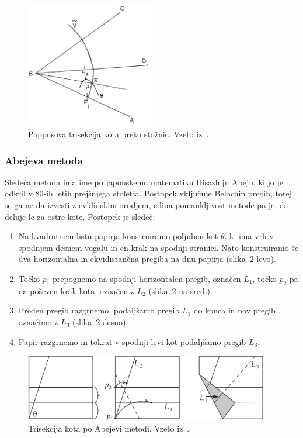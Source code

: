 \begin{figure}[h]
    \centering
    \includegraphics[width=0.5\textwidth]{images/starogr_problemi/trisection_grska.png}
    \caption[Pappusova trisekcija kota]{Pappusova trisekcija kota preko stožnic. Vzeto iz~\cite[str.\ 7]{videla1997}.}
    \label{fig:trisection_gr}
\end{figure}

\subsubsection*{Abejeva metoda}

Sledeča metoda ima ime po japonskemu matematiku Hisashiju Abeju, ki jo je odkril v $80$-ih letih prejšnjega stoletja. Postopek vključuje Belochin pregib, torej se ga ne da izvesti z evklidskim orodjem, edina pomankljivost metode pa je, da deluje le za ostre kote. Postopek je sledeč:

\begin{enumerate}
    \item Na kvadratnem listu papirja konstruiramo poljuben kot $\theta$, ki ima vrh v spodnjem desnem vogalu in en krak na spodnji stranici. Nato konstruiramo še dva horizontalna in ekvidistančna pregiba na dnu papirja (slika~\ref{fig:abe_1} levo).
    \item Točko $p_1$ prepognemo na spodnji horizontalen pregib, označen $L_1$, točko $p_2$ pa na poševen krak kota, označen z $L_2$ (slika~\ref{fig:abe_1} na sredi).
    \item Preden pregib razgrnemo, podaljšamo pregib $L_1$ do konca in nov pregib označimo z $L_3$ (slika~\ref{fig:abe_1} desno).
    \item Papir razgrnemo in tokrat v spodnji levi kot podaljšamo pregib $L_3$.
\end{enumerate}
\begin{figure}[h]
    \centering
    \includegraphics[width=0.95\textwidth]{images/starogr_problemi/abe_nastavek1.png}
    \caption[Abejeva metoda ($1$.\ del)]{Trisekcija kota po Abejevi metodi. Vzeto iz~\cite[str.\ 64]{hull2013}.}
    \label{fig:abe_1}
\end{figure}


